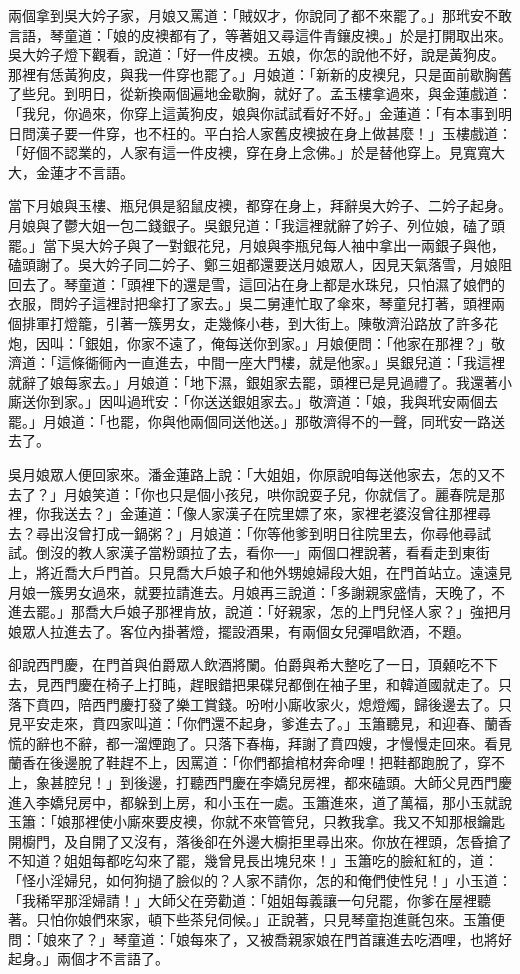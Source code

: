 兩個拿到吳大妗子家，月娘又罵道：「賊奴才，你說同了都不來罷了。」那玳安不敢言語，琴童道：「娘的皮襖都有了，等著姐又尋這件青鑲皮襖。」於是打開取出來。吳大妗子燈下觀看，說道：「好一件皮襖。五娘，你怎的說他不好，說是黃狗皮。那裡有恁黃狗皮，與我一件穿也罷了。」月娘道：「新新的皮襖兒，只是面前歇胸舊了些兒。到明日，從新換兩個遍地金歇胸，就好了。孟玉樓拿過來，與金蓮戲道：「我兒，你過來，你穿上這黃狗皮，娘與你試試看好不好。」金蓮道：「有本事到明日問漢子要一件穿，也不枉的。平白拾人家舊皮襖披在身上做甚麼！」玉樓戲道：「好個不認業的，人家有這一件皮襖，穿在身上念佛。」於是替他穿上。見寬寬大大，金蓮才不言語。

當下月娘與玉樓、瓶兒俱是貂鼠皮襖，都穿在身上，拜辭吳大妗子、二妗子起身。月娘與了鬱大姐一包二錢銀子。吳銀兒道：「我這裡就辭了妗子、列位娘，磕了頭罷。」當下吳大妗子與了一對銀花兒，月娘與李瓶兒每人袖中拿出一兩銀子與他，磕頭謝了。吳大妗子同二妗子、鄭三姐都還要送月娘眾人，因見天氣落雪，月娘阻回去了。琴童道：「頭裡下的還是雪，這回沾在身上都是水珠兒，只怕濕了娘們的衣服，問妗子這裡討把傘打了家去。」吳二舅連忙取了傘來，琴童兒打著，頭裡兩個排軍打燈籠，引著一簇男女，走幾條小巷，到大街上。陳敬濟沿路放了許多花炮，因叫：「銀姐，你家不遠了，俺每送你到家。」月娘便問：「他家在那裡？」敬濟道：「這條衚衕內一直進去，中間一座大門樓，就是他家。」吳銀兒道：「我這裡就辭了娘每家去。」月娘道：「地下濕，銀姐家去罷，頭裡已是見過禮了。我還著小廝送你到家。」因叫過玳安：「你送送銀姐家去。」敬濟道：「娘，我與玳安兩個去罷。」月娘道：「也罷，你與他兩個同送他送。」那敬濟得不的一聲，同玳安一路送去了。

吳月娘眾人便回家來。潘金蓮路上說：「大姐姐，你原說咱每送他家去，怎的又不去了？」月娘笑道：「你也只是個小孩兒，哄你說耍子兒，你就信了。麗春院是那裡，你我送去？」金蓮道：「像人家漢子在院里嫖了來，家裡老婆沒曾往那裡尋去？尋出沒曾打成一鍋粥？」月娘道：「你等他爹到明日往院里去，你尋他尋試試。倒沒的教人家漢子當粉頭拉了去，看你──」兩個口裡說著，看看走到東街上，將近喬大戶門首。只見喬大戶娘子和他外甥媳婦段大姐，在門首站立。遠遠見月娘一簇男女過來，就要拉請進去。月娘再三說道：「多謝親家盛情，天晚了，不進去罷。」那喬大戶娘子那裡肯放，說道：「好親家，怎的上門兒怪人家？」強把月娘眾人拉進去了。客位內掛著燈，擺設酒果，有兩個女兒彈唱飲酒，不題。

卻說西門慶，在門首與伯爵眾人飲酒將闌。伯爵與希大整吃了一日，頂顙吃不下去，見西門慶在椅子上打盹，趕眼錯把果碟兒都倒在袖子里，和韓道國就走了。只落下賁四，陪西門慶打發了樂工賞錢。吩咐小廝收家火，熄燈燭，歸後邊去了。只見平安走來，賁四家叫道：「你們還不起身，爹進去了。」玉簫聽見，和迎春、蘭香慌的辭也不辭，都一溜煙跑了。只落下春梅，拜謝了賁四嫂，才慢慢走回來。看見蘭香在後邊脫了鞋趕不上，因罵道：「你們都搶棺材奔命哩！把鞋都跑脫了，穿不上，象甚腔兒！」到後邊，打聽西門慶在李嬌兒房裡，都來磕頭。大師父見西門慶進入李嬌兒房中，都躲到上房，和小玉在一處。玉簫進來，道了萬福，那小玉就說玉簫：「娘那裡使小廝來要皮襖，你就不來管管兒，只教我拿。我又不知那根鑰匙開櫥門，及自開了又沒有，落後卻在外邊大櫥拒里尋出來。你放在裡頭，怎昏搶了不知道？姐姐每都吃勾來了罷，幾曾見長出塊兒來！」玉簫吃的臉紅紅的，道：「怪小淫婦兒，如何狗撾了臉似的？人家不請你，怎的和俺們使性兒！」小玉道： 「我稀罕那淫婦請！」大師父在旁勸道：「姐姐每義讓一句兒罷，你爹在屋裡聽著。只怕你娘們來家，頓下些茶兒伺候。」正說著，只見琴童抱進氈包來。玉簫便問：「娘來了？」琴童道：「娘每來了，又被喬親家娘在門首讓進去吃酒哩，也將好起身。」兩個才不言語了。


